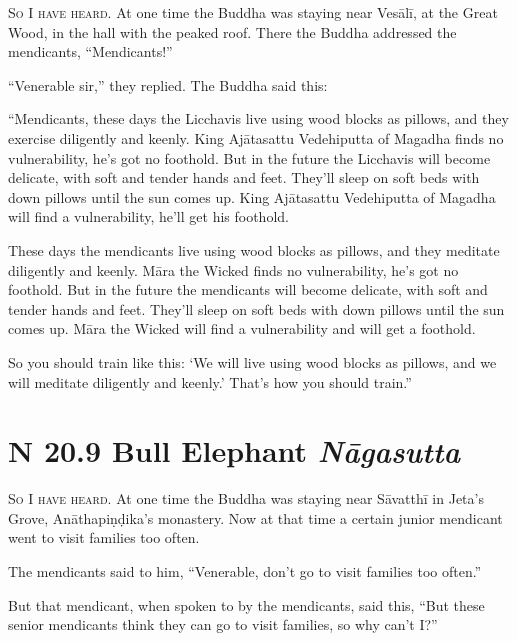 \documentclass[12pt,openany]{book}%
\newcommand*{\suttatitleacronym}[1]{\smaller[2]{#1}\vspace*{.3em}}
\newcommand*{\suttatitletranslation}[1]{\linebreak{#1}}
\newcommand*{\suttatitleroot}[1]{\linebreak\smaller[2]\itshape{#1}}
\newcommand*{\tocacronym}[1]{\hspace*{-3.3em}{#1}\quad}
\newcommand*{\toctranslation}[1]{#1}
\newcommand*{\tocroot}[1]{(\textit{#1})}
\newcommand*{\scevam}[1]{\textsc{#1}}
\begin{document}
\scevam{So I have heard. }At one time the Buddha was staying near \textsanskrit{Vesālī}, at the Great Wood, in the hall with the peaked roof. There the Buddha addressed the mendicants, “Mendicants!” 

“Venerable sir,” they replied. The Buddha said this: 

“Mendicants, these days the Licchavis live using wood blocks as pillows, and they exercise diligently and keenly. King \textsanskrit{Ajātasattu} Vedehiputta of Magadha finds no vulnerability, he’s got no foothold. But in the future the Licchavis will become delicate, with soft and tender hands and feet. They’ll sleep on soft beds with down pillows until the sun comes up. King \textsanskrit{Ajātasattu} Vedehiputta of Magadha will find a vulnerability, he’ll get his foothold. 

These days the mendicants live using wood blocks as pillows, and they meditate diligently and keenly. \textsanskrit{Māra} the Wicked finds no vulnerability, he's got no foothold. But in the future the mendicants will become delicate, with soft and tender hands and feet. They’ll sleep on soft beds with down pillows until the sun comes up. \textsanskrit{Māra} the Wicked will find a vulnerability and will get a foothold. 

So you should train like this: ‘We will live using wood blocks as pillows, and we will meditate diligently and keenly.’ That’s how you should train.” 

%
\section*{{\suttatitleacronym SN 20.9}{\suttatitletranslation A Bull Elephant }{\suttatitleroot Nāgasutta}}
\addcontentsline{toc}{section}{\tocacronym{SN 20.9} \toctranslation{A Bull Elephant } \tocroot{Nāgasutta}}

\scevam{So I have heard. }At one time the Buddha was staying near \textsanskrit{Sāvatthī} in Jeta’s Grove, \textsanskrit{Anāthapiṇḍika}’s monastery. Now at that time a certain junior mendicant went to visit families too often. 

The mendicants said to him, “Venerable, don’t go to visit families too often.” 

But that mendicant, when spoken to by the mendicants, said this, “But these senior mendicants think they can go to visit families, so why can’t I?” 
\end{document}
